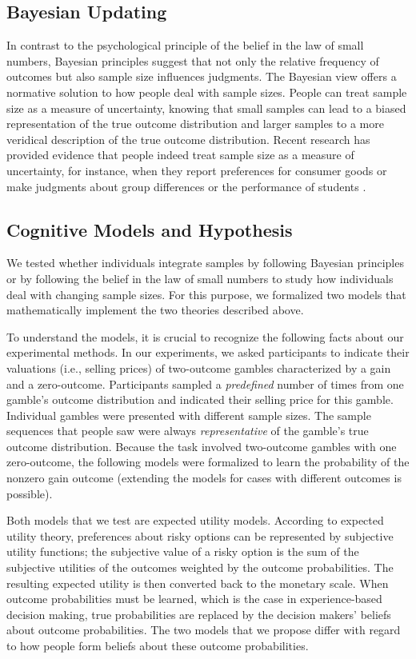 \documentclass[a4paper, man, natbib, floatsintext]{apa6} %
\begin{document}
\subsection{Bayesian Updating}
In contrast to the psychological principle of the belief in the law of small numbers, Bayesian principles suggest that not only the relative frequency of outcomes but also sample size influences judgments. The Bayesian view offers a normative solution to how people deal with sample sizes. People can treat sample size as a measure of uncertainty, knowing that small samples can lead to a biased representation of the true outcome distribution and larger samples to a more veridical description of the true outcome distribution. Recent research has provided evidence that people indeed treat sample size as a measure of uncertainty, for instance, when they report preferences for consumer goods \citep{DeMartino2017} or make judgments about group differences \citep{Obrecht2010} or the performance of students \citep{Fiedler2002}.

\subsection{Cognitive Models and Hypothesis}
We tested whether individuals integrate samples by following Bayesian principles or by following the belief in the law of small numbers to study how individuals deal with changing sample sizes. For this purpose, we formalized two models that mathematically implement the two theories described above. 


To understand the models, it is crucial to recognize the following facts about our experimental methods. In our experiments, we asked participants to indicate their valuations (i.e., selling prices) of two-outcome gambles characterized by a gain and a zero-outcome. Participants sampled a \textit{predefined} number of times from one gamble's outcome distribution and  indicated their selling price for this gamble. Individual gambles were presented with different sample sizes. The sample sequences that people saw were always \textit{representative} of the gamble's true outcome distribution. Because the task involved two-outcome gambles with one zero-outcome, the following models were formalized to learn the probability of the nonzero gain outcome (extending the models for cases with different outcomes is possible).

Both models that we test are expected utility models. According to expected utility theory, preferences about risky options can be represented by subjective utility functions; the subjective value of a risky option is the sum of the subjective utilities of the outcomes weighted by the outcome probabilities. The resulting expected utility is then converted back to the monetary scale. When outcome probabilities must be learned, which is the case in experience-based decision making, true probabilities are replaced by the decision makers' beliefs about outcome probabilities. The two models that we propose differ with regard to how people form beliefs about these outcome probabilities.
\end{document}

